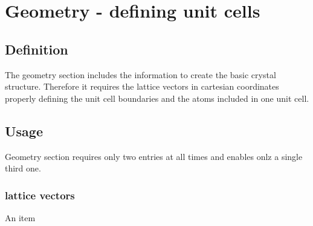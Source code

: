 \section{Geometry - defining unit cells} 
\subsection{Definition}
The geometry section includes the information to create the basic crystal structure. Therefore it requires the lattice vectors in cartesian coordinates properly defining the unit cell boundaries and the atoms included in one unit cell.

\subsection{Usage}
Geometry section requires only two entries at all times and enables onlz a single third one.\\
\subsubsection{lattice vectors}
An item 